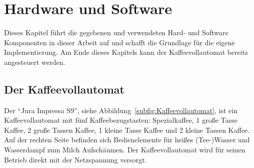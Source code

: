 \chapter{Hardware und Software}\label{ch:HardwareUndSoftware}
Dieses Kapitel führt die gegebenen und verwendeten Hard- und Software Komponenten in dieser Arbeit auf und schafft die Grundlage für die eigene Implementierung.
Am Ende dieses Kapitels kann der Kaffeevollautomat bereits angesteuert werden.

\section{Der Kaffeevollautomat}
Der "`Jura Impressa S9"', siehe Abbildung~\ref{subfig:Kaffeevollautomat}, ist ein Kaffeevollautomat mit fünf Kaffeebezugstasten: Spezialkaffee, 1 große Tasse Kaffee, 2 große Tassen Kaffee, 1 kleine Tasse Kaffee und 2 kleine Tassen Kaffee.
Auf der rechten Seite befinden sich Bedienelemente für heißes (Tee-)Wasser und Wasserdampf zum Milch Aufschäumen.
Der Kaffeevollautomat wird für seinen Betrieb direkt mit der Netzspannung versorgt.

